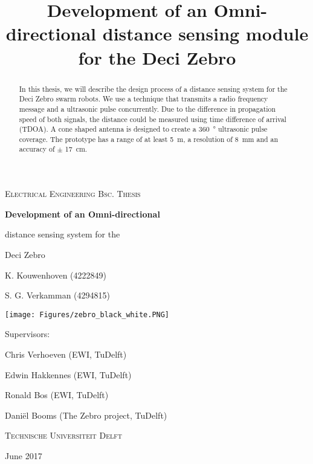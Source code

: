 \documentclass[
11pt, %
english, %
singlespacing, %
headsepline, %
]{MastersDoctoralThesis} %
\title{Development of an Omni-directional distance sensing module for the Deci Zebro}
\begin{document}
\frontmatter %

\pagestyle{plain} %



 \begin{titlepage}

	\vspace{1cm}
	{\scshape\Large Electrical Engineering Bsc. Thesis\par}
	\vspace{1cm}
	{\huge\bfseries Development of an Omni-directional\par distance sensing system for the\par Deci Zebro\par}
	\vspace{1.5cm}
	K. Kouwenhoven (4222849) \par S. G. Verkamman (4294815)\par
	\vspace{1.5cm}
  \texttt{[image: Figures/zebro\_black\_white.PNG]}\par
	\vfill
	{\Large Supervisors:\par}
	Chris Verhoeven (EWI, TuDelft)\par
	Edwin Hakkennes (EWI, TuDelft)\par
	Ronald Bos (EWI, TuDelft)\par
	Daniël Booms (The Zebro project, TuDelft)\par
	\vspace{1cm}
	{\scshape\large Technische Universiteit Delft\par}
	{\large June 2017}
 \end{titlepage}


\begin{abstract}
\addchaptertocentry{\abstractname} %
In this thesis, we will describe the design process of a distance sensing system for the Deci Zebro swarm robots.
We use a technique that transmits a radio frequency message and a ultrasonic pulse concurrently.
Due to the difference in propagation speed of both signals, the distance could be measured using time difference of arrival (TDOA).
A cone shaped antenna is designed to create a \SI{360}{\degree} ultrasonic pulse coverage.
The prototype has a range of at least \SI{5}{\meter}, a resolution of \SI{8}{\milli\meter} and an accuracy of $\pm$ \SI{17}{\centi\meter}.
\end{abstract}
\end{document}

